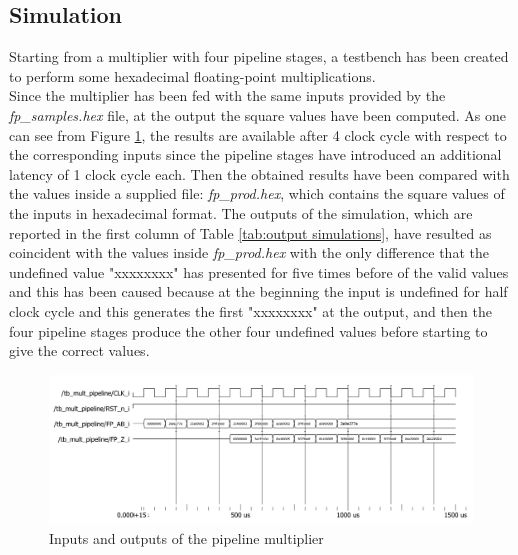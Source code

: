 \documentclass[a4paper, titlepage]{article}
\begin{document}
\subsection{Simulation}
Starting from a multiplier with four pipeline stages, a testbench has been created to perform some hexadecimal floating-point multiplications.
\\
Since the multiplier has been fed with the same inputs provided by the \textit{fp\_samples.hex} file, at the output the square values have been computed.
As one can see from Figure \ref{fig:sim_no_reg}, the results are available after 4 clock cycle with respect to the corresponding inputs since the pipeline stages have introduced an additional latency of 1 clock cycle each.
Then the obtained results have been compared with the values inside a supplied file: \textit{fp\_prod.hex}, which contains the square values of the inputs in hexadecimal format. The outputs of the simulation, which are reported in the first column of Table \ref{tab:output simulations}, have resulted as coincident with the values inside \textit{fp\_prod.hex} with the only difference that the undefined value "xxxxxxxx" has presented for five times before of the valid values and this has been caused because at the beginning the input is undefined for half clock cycle and this generates the first "xxxxxxxx" at the output, and then the four pipeline stages produce the other four undefined values before starting to give the correct values. 
\begin{figure} [h]
\centering
\includegraphics[scale=0.5]{print_sim_no_reg.png}
	\caption{Inputs and outputs of the pipeline multiplier}
	\label{fig:sim_no_reg}
\end{figure}
\end{document}
